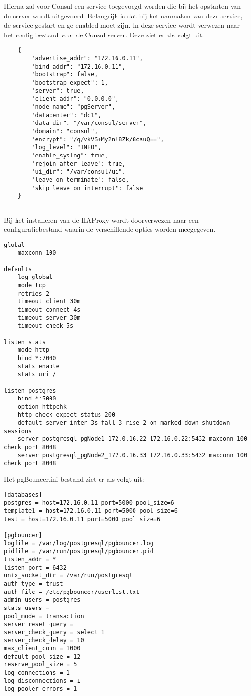 Hierna zal voor Consul een service toegevoegd worden die bij het opstarten van de server wordt uitgevoerd. Belangrijk is dat bij het aanmaken van deze service, de service gestart en ge-enabled moet zijn. In deze service wordt verwezen naar het config bestand voor de Consul server. Deze ziet er als volgt uit.

\begin{lstlisting}
    {
        "advertise_addr": "172.16.0.11",
        "bind_addr": "172.16.0.11",
        "bootstrap": false,
        "bootstrap_expect": 1,
        "server": true,
        "client_addr": "0.0.0.0",
        "node_name": "pgServer",
        "datacenter": "dc1",
        "data_dir": "/var/consul/server",
        "domain": "consul",
        "encrypt": "/q/vkVS+My2nl8Zk/8csuQ==",
        "log_level": "INFO",
        "enable_syslog": true,
        "rejoin_after_leave": true,
        "ui_dir": "/var/consul/ui",
        "leave_on_terminate": false,
        "skip_leave_on_interrupt": false
    }
    
 \end{lstlisting}

Bij het installeren van de HAProxy wordt doorverwezen naar een configuratiebestand waarin de verschillende opties worden meegegeven.

\begin{lstlisting}
global
    maxconn 100

defaults
    log global
    mode tcp
    retries 2
    timeout client 30m
    timeout connect 4s
    timeout server 30m
    timeout check 5s

listen stats
    mode http
    bind *:7000
    stats enable
    stats uri /

listen postgres
    bind *:5000
    option httpchk
    http-check expect status 200
    default-server inter 3s fall 3 rise 2 on-marked-down shutdown-sessions
    server postgresql_pgNode1_172.0.16.22 172.16.0.22:5432 maxconn 100 check port 8008
    server postgresql_pgNode2_172.0.16.33 172.16.0.33:5432 maxconn 100 check port 8008
\end{lstlisting}

Het pgBouncer.ini bestand ziet er als volgt uit:

\begin{lstlisting}
[databases]
postgres = host=172.16.0.11 port=5000 pool_size=6
template1 = host=172.16.0.11 port=5000 pool_size=6
test = host=172.16.0.11 port=5000 pool_size=6

[pgbouncer]
logfile = /var/log/postgresql/pgbouncer.log
pidfile = /var/run/postgresql/pgbouncer.pid
listen_addr = *
listen_port = 6432
unix_socket_dir = /var/run/postgresql
auth_type = trust
auth_file = /etc/pgbouncer/userlist.txt
admin_users = postgres
stats_users =
pool_mode = transaction
server_reset_query =
server_check_query = select 1
server_check_delay = 10
max_client_conn = 1000
default_pool_size = 12
reserve_pool_size = 5
log_connections = 1
log_disconnections = 1
log_pooler_errors = 1  
\end{lstlisting}


